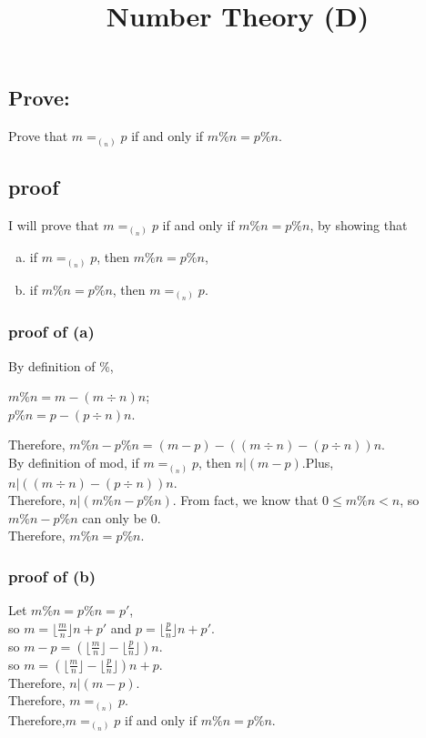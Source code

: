 \documentclass{article}
\title{Number Theory (D)}
\author{}
\date{}
\begin{document}
	\begin{spacing}{1.5}
		\maketitle
		
		\section*{Prove:}
		Prove that $m = _{(_n)}p$ if and only if $m \% n=p\%n $.
		
		\subsection*{proof}
		I will prove that $m = _{(_n)}p$ if and only if $m \% n=p\%n $, by showing that 
		\begin{enumerate}[(a)]
			\item if $m = _{(_n)}p$, then $m \% n=p\%n $,
			\item if $m \% n=p\%n$, then $m = _{(_n)}p$.
		\end{enumerate}
		
		\subsubsection*{proof of (a)}
		By definition of \%,
		\begin{center}
			$ m \% n = m-(m \div n)n  $;\\
			$ p \% n = p-(p \div n)n  $.
		\end{center}
		Therefore, $ m \% n - p \% n = (m-p)-((m \div n)-(p \div n))n $.\\
		By definition of mod, if $ m = _{(_n)}p $, then $ n|(m-p) $.Plus, $ n|((m \div n)-(p \div n))n $.\\
		Therefore, $ n|(m \% n - p \% n) $. From fact, we know that $ 0 \leq m \% n < n $, so $ m \% n - p \% n $ can only be $ 0 $.\\
		Therefore, $m \% n=p\%n $.
		
		\subsubsection*{proof of (b)}
		Let $m\%n=p\%n=p'$,\\
		so $m=\lfloor \frac{m}{n}\rfloor n+p'$ and $p=\lfloor \frac{p}{n}\rfloor n+p'$.\\
		so $m-p=(\lfloor \frac{m}{n}\rfloor -\lfloor \frac{p}{n}\rfloor)n$.\\
		so $m=(\lfloor \frac{m}{n}\rfloor -\lfloor \frac{p}{n}\rfloor)n+p$.\\
		Therefore, $n|(m-p)$.\\
		Therefore, $m= _{(_n)}p$.\\
		Therefore,$m = _{(_n)}p$ if and only if $m \% n=p\%n $.
		
	\end{spacing}

	
	
\end{document}
